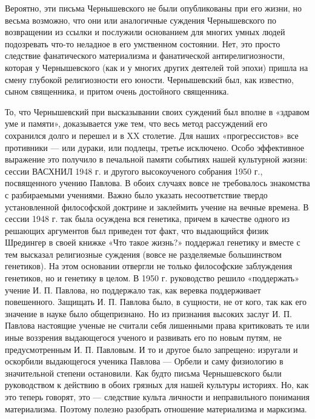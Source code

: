 Вероятно, эти письма Чернышевского не были опубликованы при его жизни,
но  весьма возможно,  что они  или аналогичные  суждения Чернышевского
по  возвращении из  ссылки  и послужили  основанием  для многих  умных
людей  подозревать что-то  неладное в  его умственном  состоянии. Нет,
это  просто   следствие  фанатического  материализма   и  фанатической
антирелигиозности,  которая у  Чернышевского  (как и  у многих  других
деятелей той эпохи) пришла на смену глубокой религиозности его юности.
Чернышевский  был,  как известно,  сыном  священника,  и притом  очень
достойного священника.

То,  что  Чернышевский  при  высказывании своих  суждений  был  вполне
в  «здравом  уме и  памяти»,  доказывается  уже  тем, что  весь  метод
рассуждений его сохранился долго и перешел  и в XX столетие. Для наших
«прогрессистов»  все противники  --- или  дураки, или  подлецы, третье
исключено. Особо эффективное выражение это получило в печальной памяти
событиях  нашей культурной  жизни: сессии  ВАСХНИЛ 1948  г. и  другого
высокоученого собрания  1950 г., посвященного учению  Павлова. В обоих
случаях вовсе не требовалось знакомства с разбираемыми учениями. Важно
было указать несоответствие  твердо установленной философской доктрине
и  заклеймить учение  на вечные  времена. В  сессии 1948  г. так  была
осуждена вся генетика, причем в качестве одного из решающих аргументов
был приведен тот  факт, что выдающийся физик Шредингер  в своей книжке
«Что  такое  жизнь?»  поддержал  генетику  и  вместе  с  тем  высказал
религиозные суждения (вовсе не разделяемые большинством генетиков). На
этом основании  отвергли не только философские  заблуждения генетиков,
но  и генетику  в целом.  В  1950 г.  руководство решило  «поддержать»
учение  И. П.  Павлова, но  поддержало так,  как веревка  поддерживает
повешенного. Защищать И. П. Павлова было,  в сущности, не от кого, так
как его  значение в науке  было общепризнано. Но из  признания высоких
заслуг И. П. Павлова настоящие  ученые не считали себя лишенными права
критиковать те или иные воззрения  выдающегося ученого и развивать его
по новым путям, не предусмотренным И.  П. Павловым. И то и другое было
запрещено: изругали и оскорбили выдающегося ученика Павлова --- Орбели
и  саму  физиологию  в  значительной  степени  остановили.  Как  будто
письма  Чернышевского были  руководством  к действию  в обоих  грязных
для  нашей культуры  историях. Но,  как  это теперь  говорят, это  ---
следствие  культа  личности  и неправильного  понимания  материализма.
Поэтому полезно разобрать отношение материализма и марксизма.

